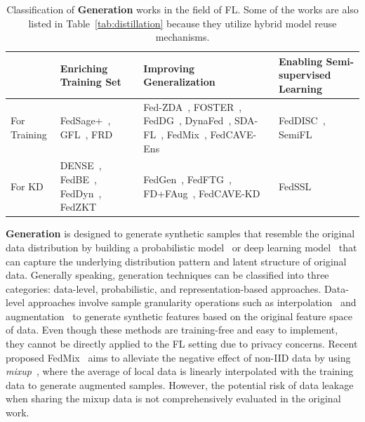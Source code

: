\begin{table}[]
  \centering
  \footnotesize
  \caption{Classification of \textbf{Generation} works in the field of FL. Some of the works are also listed in Table~\ref{tab:distillation} because they utilize hybrid model reuse mechanisms.}
  \label{tab:generation}

  \begin{tabular}{|l|p{3.1cm}|p{5cm}|p{4cm}|}
    \hline
    & Enriching Training Set & Improving Generalization  & Enabling Semi-supervised Learning  \\ \hline
    \multicolumn{1}{|l|}{For Training} & FedSage+~\cite{zhang2021subgraph}, GFL~\cite{cheng2023gfl}, \newline FRD~\cite{cha2019federated} & Fed-ZDA~\cite{hao2021towards}, FOSTER~\cite{yu2023turning}, FedDG~\cite{liu2021feddg}, DynaFed~\cite{pi2022dynafed}, SDA-FL~\cite{liz2022federated}, FedMix~\cite{yoon2021fedmix}, \newline FedCAVE-Ens~\cite{heinbaugh2023data} & FedDISC~\cite{yang2023exploring}, SemiFL~\cite{diao2022semifl}  \\ \hline
    \multicolumn{1}{|l|}{For KD} & DENSE~\cite{zhang2022dense}, FedBE~\cite{chen2020fedbe}, \newline FedDyn~\cite{jin2023feddyn}, FedZKT~\cite{zhang2022fedzkt} & FedGen~\cite{zhu2021data}, FedFTG~\cite{zhang2022fine}, FD+FAug~\cite{jeong2018communication}, \newline FedCAVE-KD~\cite{heinbaugh2023data} & FedSSL~\cite{fan2022private} \\ \hline
  \end{tabular}
\end{table}

\textbf{Generation} is designed to generate synthetic samples that resemble the original data distribution by building a probabilistic model~\cite{geyer1992practical} or deep learning model~\cite{kingma2014auto, goodfellow2020generative, cao2022survey} that can capture the underlying distribution pattern and latent structure of original data.
Generally speaking, generation techniques can be classified into three categories: data-level, probabilistic, and representation-based approaches.
Data-level approaches involve sample granularity operations such as interpolation~\cite{chawla2002smote, zhangmixup} and augmentation~\cite{wong2016understanding} to generate synthetic features based on the original feature space of data.
Even though these methods are training-free and easy to implement, they cannot be directly applied to the FL setting due to privacy concerns.
Recent proposed FedMix~\cite{yoon2021fedmix} aims to alleviate the negative effect of non-IID data by using \textit{mixup}~\cite{zhangmixup}, where the average of local data is linearly interpolated with the training data to generate augmented samples.
However, the potential risk of data leakage when sharing the mixup data is not comprehensively evaluated in the original work.

